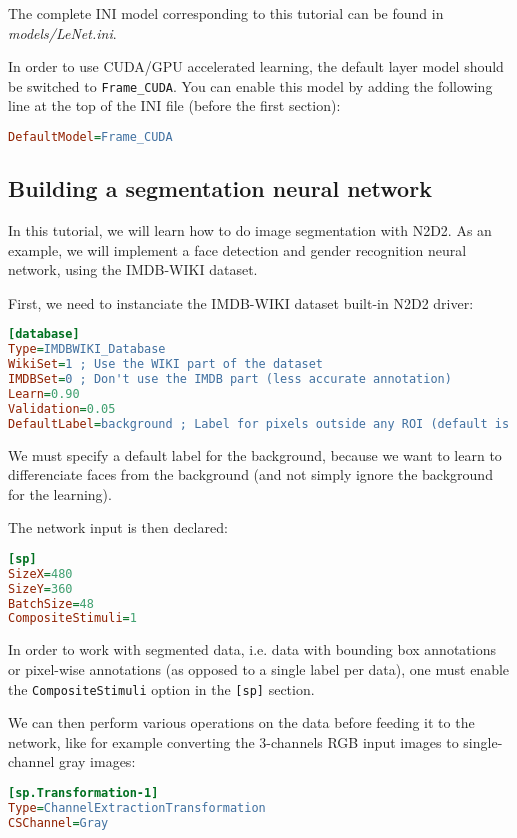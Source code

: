 \documentclass[a4paper,11pt,oneside]{article}
\begin{document}
The complete INI model corresponding to this tutorial can be found in
\emph{models/LeNet.ini}.

In order to use CUDA/GPU accelerated learning, the default layer model should be
switched to \lstinline!Frame_CUDA!. You can enable this model by adding the
following line at the top of the INI file (before the first section):
\begin{lstlisting}[language=ini]
DefaultModel=Frame_CUDA
\end{lstlisting}

\subsection{Building a segmentation neural network}

In this tutorial, we will learn how to do image segmentation with N2D2. As an
example, we will implement a face detection and gender recognition neural
network, using the IMDB-WIKI dataset.

First, we need to instanciate the IMDB-WIKI dataset built-in N2D2 driver:

\begin{lstlisting}[language=ini]
[database]
Type=IMDBWIKI_Database
WikiSet=1 ; Use the WIKI part of the dataset
IMDBSet=0 ; Don't use the IMDB part (less accurate annotation)
Learn=0.90
Validation=0.05
DefaultLabel=background ; Label for pixels outside any ROI (default is no label, pixels are ignored)
\end{lstlisting}

We must specify a default label for the background, because we want to learn to
differenciate faces from the background (and not simply ignore the background
for the learning).

The network input is then declared:
\begin{lstlisting}[language=ini]
[sp]
SizeX=480
SizeY=360
BatchSize=48
CompositeStimuli=1
\end{lstlisting}

In order to work with segmented data, i.e. data with bounding box annotations or
pixel-wise annotations (as opposed to a single label per data), one must enable
the \lstinline!CompositeStimuli! option in the \lstinline![sp]! section.

We can then perform various operations on the data before feeding it to the
network, like for example converting the 3-channels RGB input images to
single-channel gray images:

\begin{lstlisting}[language=ini]
[sp.Transformation-1]
Type=ChannelExtractionTransformation
CSChannel=Gray
\end{lstlisting}
\end{document}
